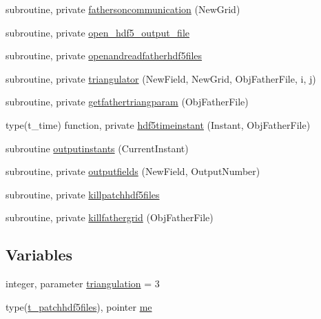 \begin{DoxyCompactItemize}
\item 
subroutine, private \mbox{\hyperlink{namespacemodulepatchhdf5files_aa9e9da877fcc2414ea0022fe33fa09e9}{fathersoncommunication}} (New\+Grid)
\item 
subroutine, private \mbox{\hyperlink{namespacemodulepatchhdf5files_ad3c3d3284e4aaad5b2b6c70612fbc40b}{open\+\_\+hdf5\+\_\+output\+\_\+file}}
\item 
subroutine, private \mbox{\hyperlink{namespacemodulepatchhdf5files_aa13f313e5bea3ff364240319fb791f70}{openandreadfatherhdf5files}}
\item 
subroutine, private \mbox{\hyperlink{namespacemodulepatchhdf5files_a5d3c460838e5e6b1caa6735da5973943}{triangulator}} (New\+Field, New\+Grid, Obj\+Father\+File, i, j)
\item 
subroutine, private \mbox{\hyperlink{namespacemodulepatchhdf5files_ae089f4cffb7f9cab00153e6819836597}{getfathertriangparam}} (Obj\+Father\+File)
\item 
type(t\+\_\+time) function, private \mbox{\hyperlink{namespacemodulepatchhdf5files_ae7939a4a353ce44a104d18abfe71c0ef}{hdf5timeinstant}} (Instant, Obj\+Father\+File)
\item 
subroutine \mbox{\hyperlink{namespacemodulepatchhdf5files_a5a84e7c89a2de8e50674a804e7e307b0}{outputinstants}} (Current\+Instant)
\item 
subroutine, private \mbox{\hyperlink{namespacemodulepatchhdf5files_a32322a9b20e258cf772b50096c520369}{outputfields}} (New\+Field, Output\+Number)
\item 
subroutine, private \mbox{\hyperlink{namespacemodulepatchhdf5files_a28038c83fc0a33bceb0c35f3e9ba08af}{killpatchhdf5files}}
\item 
subroutine, private \mbox{\hyperlink{namespacemodulepatchhdf5files_a9cdefa24170268bd385859fedc04a136}{killfathergrid}} (Obj\+Father\+File)
\end{DoxyCompactItemize}
\subsection*{Variables}
\begin{DoxyCompactItemize}
\item 
integer, parameter \mbox{\hyperlink{namespacemodulepatchhdf5files_a439d7df47b711c777dcf57041c223f85}{triangulation}} = 3
\item 
type(\mbox{\hyperlink{structmodulepatchhdf5files_1_1t__patchhdf5files}{t\+\_\+patchhdf5files}}), pointer \mbox{\hyperlink{namespacemodulepatchhdf5files_a95897e5f337f1d8ca5daa5b7a5d9654e}{me}}
\end{DoxyCompactItemize}


